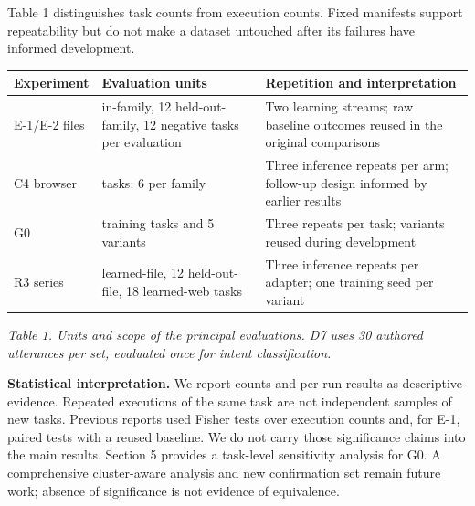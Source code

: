 \documentclass[
  10pt,
]{article}
\newcounter{none} %
\begin{document}
Table 1 distinguishes task counts from execution counts. Fixed manifests
support repeatability but do not make a dataset untouched after its
failures have informed development.

{\def\LTcaptype{none} %
\begin{longtable}[]{@{}
  >{\raggedright\arraybackslash}p{}
  >{\raggedright\arraybackslash}p{}
  >{\raggedright\arraybackslash}p{}@{}}
\toprule\noalign{}
\begin{minipage}[b]{\linewidth}\raggedright
Experiment
\end{minipage} & \begin{minipage}[b]{\linewidth}\raggedright
Evaluation units
\end{minipage} & \begin{minipage}[b]{\linewidth}\raggedright
Repetition and interpretation
\end{minipage} \\
\midrule\noalign{}
\endhead
\bottomrule\noalign{}
\endlastfoot
E-1/E-2 files & 24 in-family, 12 held-out-family, 12 negative tasks per
evaluation & Two learning streams; raw baseline outcomes reused in the
original comparisons \\
C4 browser & 30 tasks: 6 per family & Three inference repeats per arm;
follow-up design informed by earlier results \\
G0 & 10 training tasks and 5 variants & Three repeats per task; variants
reused during development \\
R3 series & 24 learned-file, 12 held-out-file, 18 learned-web tasks &
Three inference repeats per adapter; one training seed per variant \\
\end{longtable}
}

\emph{Table 1. Units and scope of the principal evaluations. D7 uses 30
authored utterances per set, evaluated once for intent classification.}

\textbf{Statistical interpretation.} We report counts and per-run
results as descriptive evidence. Repeated executions of the same task
are not independent samples of new tasks. Previous reports used Fisher
tests over execution counts and, for E-1, paired tests with a reused
baseline. We do not carry those significance claims into the main
results. Section 5 provides a task-level sensitivity analysis for G0. A
comprehensive cluster-aware analysis and new confirmation set remain
future work; absence of significance is not evidence of equivalence.
\end{document}
